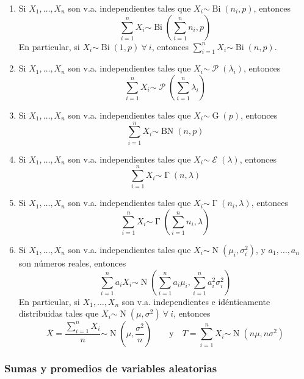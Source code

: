 \documentclass[11pt]{article}
\theoremstyle{plain}
\theoremstyle{definition}
\theoremstyle{remark}
\newcommand{\foralle}{\ensuremath{\forall \ }}  %
\newcommand{\dist}[1]{\ensuremath{\sim \operatorname{#1}}}  %
\newcommand{\poisson}[0]{\ensuremath{\mathcal{P}}}  %
\newcommand{\exponen}[0]{\ensuremath{\mathcal{E}}}  %
\begin{document}
      \begin{enumerate}
        \item Si $X_1, \dots, X_n$ son v.a. independientes tales que $X_i \dist{Bi}(n_i,p)$, entonces
        \[ \sum_{i=1}^n X_i \dist{Bi}\left( \sum_{i=1}^n n_i, p \right) \]
        En particular, si $X_i \dist{Bi}(1,p) \ \foralle i$, entonces $\sum_{i=1}^n X_i \dist{Bi}(n,p)$.

        \item Si $X_1, \dots, X_n$ son v.a. independientes tales que $X_i \dist{\poisson}(\lambda_i)$, entonces
        \[ \sum_{i=1}^n X_i \dist{\poisson}\left( \sum_{i=1}^n \lambda_i \right) \]

        \item Si $X_1, \dots, X_n$ son v.a. independientes tales que $X_i \dist{G}(p)$, entonces
        \[ \sum_{i=1}^n X_i \dist{BN}(n,p) \]

        \item Si $X_1, \dots, X_n$ son v.a. independientes tales que $X_i \dist{\exponen}(\lambda)$, entonces
        \[ \sum_{i=1}^n X_i \dist{\Gamma}(n,\lambda) \]

        \item Si $X_1, \dots, X_n$ son v.a. independientes tales que $X_i \dist{\Gamma}(n_i,\lambda)$, entonces
        \[ \sum_{i=1}^n X_i \dist{\Gamma}\left( \sum_{i=1}^n n_i, \lambda \right) \]

        \item Si $X_1, \dots, X_n$ son v.a. independientes tales que $X_i \dist{N}(\mu_i,\sigma_i^2)$, y $a_1,\dots,a_n$ son números reales, entonces
        \[ \sum_{i=1}^n a_i X_i \dist{N}\left( \sum_{i=1}^n a_i \mu_i, \sum_{i=1}^n a_i^2 \sigma_i^2 \right) \]
        En particular, si $X_1,\dots,X_n$ son v.a. independientes e idénticamente distribuidas tales que $X_i \dist{N}(\mu,\sigma^2) \ \foralle i$, entonces
        \[ \overline{X} = \frac{\sum_{i=1}^n X_i}{n} \dist{N}\left( \mu, \frac{\sigma^2}{n} \right) \qquad \text{y} \quad T = \sum_{i=1}^n X_i \dist{N}(n \mu,n \sigma^2) \]
      \end{enumerate}

    \subsubsection{Sumas y promedios de variables aleatorias}
\end{document}

